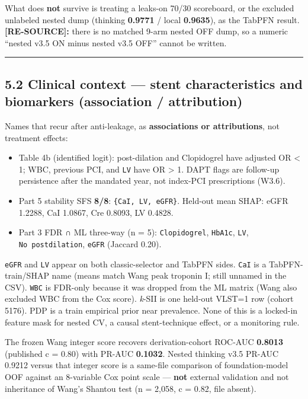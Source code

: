 \documentclass[
]{article}
\providecommand{\tightlist}{%
  \setlength{\itemsep}{0pt}\setlength{\parskip}{0pt}}
\begin{document}
What does \textbf{not} survive is treating a leaks-on 70/30 scoreboard,
or the excluded unlabeled nested dump (thinking \textbf{0.9771} / local
\textbf{0.9635}), as the TabPFN result. \textbf{{[}RE-SOURCE{]}:} there
is no matched 9-arm nested OFF dump, so a numeric ``nested v3.5 ON minus
nested v3.5 OFF'' cannot be written.

\begin{center}\rule{0.5\linewidth}{0.5pt}\end{center}

\subsection{5.2 Clinical context --- stent characteristics and
biomarkers (association /
attribution)}\label{clinical-context-stent-characteristics-and-biomarkers-association-attribution}

Names that recur after anti-leakage, as \textbf{associations or
attributions}, not treatment effects:

\begin{itemize}
\tightlist
\item
  Table 4b (identified logit): post-dilation and Clopidogrel have
  adjusted OR \textless{} 1; WBC, previous PCI, and \texttt{LV} have OR
  \textgreater{} 1. DAPT flags are follow-up persistence after the
  mandated year, not index-PCI prescriptions (W3.6).
\item
  Part 5 stability SFS \textbf{8/8}: \texttt{\{CaI,\ LV,\ eGFR\}}.
  Held-out mean \textbar SHAP\textbar: eGFR 1.2288, CaI 1.0867, Cre
  0.8093, LV 0.4828.
\item
  Part 3 FDR ∩ ML three-way (n = 5): \texttt{Clopidogrel},
  \texttt{HbA1c}, \texttt{LV}, \texttt{No\ postdilation}, \texttt{eGFR}
  (Jaccard 0.20).
\end{itemize}

\texttt{eGFR} and \texttt{LV} appear on both classic-selector and TabPFN
sides. \texttt{CaI} is a TabPFN-train/SHAP name (means match Wang peak
troponin I; still unnamed in the CSV). \texttt{WBC} is FDR-only because
it was dropped from the ML matrix (Wang also excluded WBC from the Cox
score). \emph{k}-SII is one held-out VLST=1 row (cohort 5176). PDP is a
train empirical prior near prevalence. None of this is a locked-in
feature mask for nested CV, a causal stent-technique effect, or a
monitoring rule.

The frozen Wang integer score recovers derivation-cohort ROC-AUC
\textbf{0.8013} (published c = 0.80) with PR-AUC \textbf{0.1032}. Nested
thinking v3.5 PR-AUC 0.9212 versus that integer score is a same-file
comparison of foundation-model OOF against an 8-variable Cox point scale
--- \textbf{not} external validation and not inheritance of Wang's
Shantou test (n = 2,058, c = 0.82, file absent).
\end{document}
